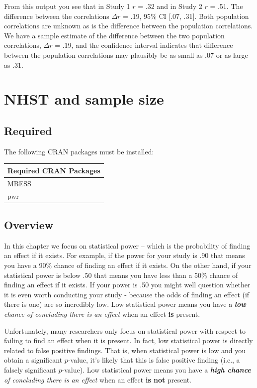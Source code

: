 \documentclass[
]{krantz}
\begin{document}
From this output you see that in Study 1 \(r\) = .32 and in Study 2 \(r\) = .51. The difference between the correlations \(\Delta r\) = .19, 95\% CI {[}.07, .31{]}. Both population correlations are unknown as is the difference between the population correlations. We have a sample estimate of the difference between the two population correlations, \(\Delta r\) = .19, and the confidence interval indicates that difference between the population correlations may plausibly be as small as .07 or as large as .31.

\hypertarget{nhst-and-sample-size}{%
\chapter{NHST and sample size}\label{nhst-and-sample-size}}

\hypertarget{required-3}{%
\section{Required}\label{required-3}}

The following CRAN packages must be installed:

\begin{longtable}[]{@{}l@{}}
\toprule
Required CRAN Packages \\
\midrule
\endhead
MBESS \\
pwr \\
\bottomrule
\end{longtable}

\hypertarget{overview-3}{%
\section{Overview}\label{overview-3}}

In this chapter we focus on statistical power -- which is the probability of finding an effect if it exists. For example, if the power for your study is .90 that means you have a 90\% chance of finding an effect if it exists. On the other hand, if your statistical power is below .50 that means you have less than a 50\% chance of finding an effect if it exists. If your power is .50 you might well question whether it is even worth conducting your study - because the odds of finding an effect (if there is one) are so incredibly low. Low statistical power means you have a \emph{\textbf{low} chance of concluding there is an effect} when an effect \textbf{is} present.

Unfortunately, many researchers only focus on statistical power with respect to failing to find an effect when it is present. In fact, low statistical power is directly related to false positive findings. That is, when statistical power is low and you obtain a significant \(p\)-value, it's likely that this is false positive finding (i.e., a falsely significant \(p\)-value). Low statistical power means you have a \emph{\textbf{high chance} of concluding there is an effect} when an effect \textbf{is not} present.
\end{document}
